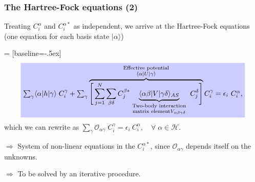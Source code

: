 \documentclass[xcolor=pdftex,hyperref={pdfpagelabels=false},table]{beamer}
\begin{document}
\begin{frame}
\frametitle{The Hartree-Fock equations (2)}
\begin{scriptsize}
Treating $C_i^\alpha$ and  $C_i^{\alpha *}$ as independent, we arrive at the Hartree-Fock equations \newline (one equation for each basis state $|\alpha \rangle$)


 = [baseline=-.5ex]
\begin{equation}
         \tikz[baseline]{
            \node[fill=blue!20, anchor=base] (a1)
            {$\sum_\gamma \langle \alpha | h| \gamma \rangle \; C_i^\gamma +   \sum_\gamma \overbrace{\Bigg[ \sum_{j=1}^N \sum_{\beta \delta} C_j^{\beta *} \underbrace{\langle \alpha \beta | V | \gamma  \delta \rangle_{AS}}_{\begin{smallmatrix}
  \text{Two-body interaction} \\
  \text{matrix element} V_{\alpha \beta \gamma \delta}
\end{smallmatrix}}  \; C_j^\delta \Bigg] }^{\begin{smallmatrix}
  \text{Effective potential} \\
  \langle \alpha |U| \gamma \rangle
\end{smallmatrix}} C_i^\gamma = \epsilon_i \ C_i^\alpha,$};}
\end{equation}
which we can rewrite as $\sum_\gamma \mathcal{O}_{\alpha \gamma} \; C_i^\gamma = \epsilon_i \ C_i^\alpha, \quad \forall \; \alpha \in \mathcal{H}$.

$\Rightarrow$ \alert{System of non-linear equations} in the $C_i^{\alpha *}$, since $\mathcal{O}_{\alpha \gamma}$ depends itself on the unknowns.

$\Rightarrow$ \alert{To be solved by an iterative procedure}.
\end{scriptsize}
\end{frame}
\end{document}
